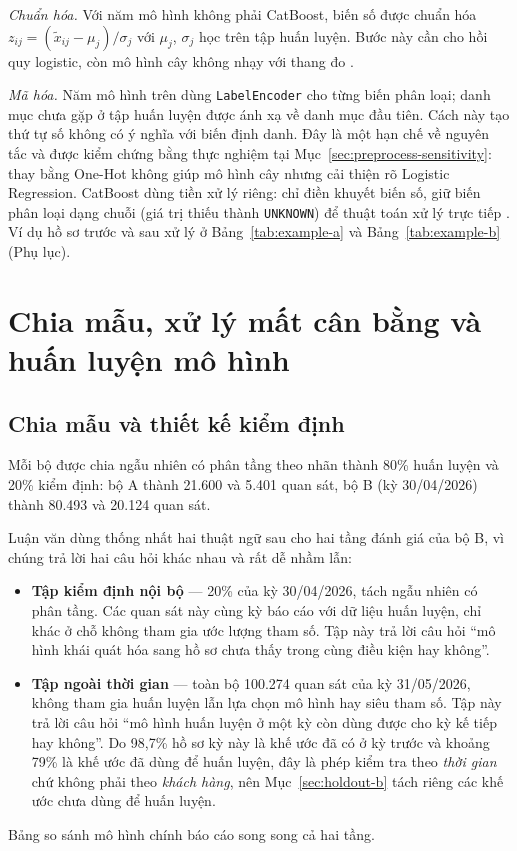 \noindent\textit{Chuẩn hóa.} Với năm mô hình không phải CatBoost, biến số được chuẩn hóa $z_{ij}=(\tilde{x}_{ij}-\mu_j)/\sigma_j$ với $\mu_j$, $\sigma_j$ học trên tập huấn luyện. Bước này cần cho hồi quy logistic, còn mô hình cây không nhạy với thang đo \cite{hosmer2013applied}.

\noindent\textit{Mã hóa.} Năm mô hình trên dùng \mbox{\texttt{LabelEncoder}} cho từng biến phân loại; danh mục chưa gặp ở tập huấn luyện được ánh xạ về danh mục đầu tiên. Cách này tạo thứ tự số không có ý nghĩa với biến định danh. Đây là một hạn chế về nguyên tắc và được kiểm chứng bằng thực nghiệm tại Mục~\ref{sec:preprocess-sensitivity}: thay bằng One-Hot không giúp mô hình cây nhưng cải thiện rõ Logistic Regression. CatBoost dùng tiền xử lý riêng: chỉ điền khuyết biến số, giữ biến phân loại dạng chuỗi (giá trị thiếu thành \texttt{UNKNOWN}) để thuật toán xử lý trực tiếp \cite{prokhorenkova2018catboost}. Ví dụ hồ sơ trước và sau xử lý ở Bảng~\ref{tab:example-a} và Bảng~\ref{tab:example-b} (Phụ lục).

\section{Chia mẫu, xử lý mất cân bằng và huấn luyện mô hình}
\label{sec:step4-split-balance}

\subsection{Chia mẫu và thiết kế kiểm định}
\label{sec:repeated-cv}

Mỗi bộ được chia ngẫu nhiên có phân tầng theo nhãn thành 80\% huấn luyện và 20\% kiểm định: bộ A thành 21.600 và 5.401 quan sát, bộ B (kỳ 30/04/2026) thành 80.493 và 20.124 quan sát.

Luận văn dùng thống nhất hai thuật ngữ sau cho hai tầng đánh giá của bộ B, vì chúng trả lời hai câu hỏi khác nhau và rất dễ nhầm lẫn:
\begin{itemize}
    \item \textbf{Tập kiểm định nội bộ} --- 20\% của kỳ 30/04/2026, tách ngẫu nhiên có phân tầng. Các quan sát này cùng kỳ báo cáo với dữ liệu huấn luyện, chỉ khác ở chỗ không tham gia ước lượng tham số. Tập này trả lời câu hỏi ``mô hình khái quát hóa sang hồ sơ chưa thấy trong cùng điều kiện hay không''.
    \item \textbf{Tập ngoài thời gian} --- toàn bộ 100.274 quan sát của kỳ 31/05/2026, không tham gia huấn luyện lẫn lựa chọn mô hình hay siêu tham số. Tập này trả lời câu hỏi ``mô hình huấn luyện ở một kỳ còn dùng được cho kỳ kế tiếp hay không''. Do 98,7\% hồ sơ kỳ này là khế ước đã có ở kỳ trước và khoảng 79\% là khế ước đã dùng để huấn luyện, đây là phép kiểm tra theo \emph{thời gian} chứ không phải theo \emph{khách hàng}, nên Mục~\ref{sec:holdout-b} tách riêng các khế ước chưa dùng để huấn luyện.
\end{itemize}
Bảng so sánh mô hình chính báo cáo song song cả hai tầng.

